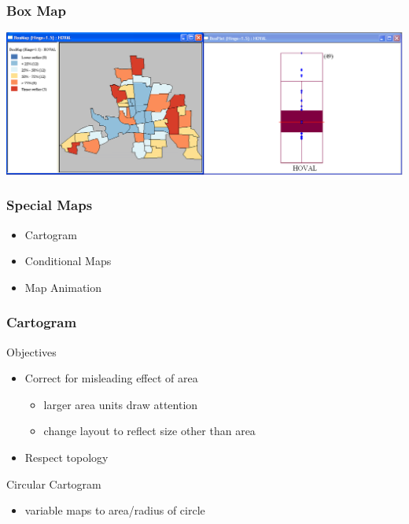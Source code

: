 \documentclass[nototal]{beamer}
\begin{document}
\begin{frame}
	\frametitle{Box Map}
 \begin{center}
 \includegraphics[width=.85\linewidth]{boxmapgeoda.png}
  \end{center}
 \end{frame} 

\begin{frame}
	\frametitle{Special Maps}
 \begin{itemize}
 \item  Cartogram
 \item  Conditional Maps
 \item  Map Animation
 \end{itemize}
 \end{frame} 

\begin{frame}
	\frametitle{Cartogram}
 
\begin{block}{Objectives}
 \begin{itemize}
 \item  Correct for  misleading effect of area
 \begin{itemize}
 \item  larger area units  draw attention
 \item  change layout to reflect size other than area
 \end{itemize}
 \item  Respect topology
 \end{itemize}
 \end{block} 
\begin{block}{Circular Cartogram}
 \begin{itemize}
 \item  variable maps to area/radius of circle
 \end{itemize}
 \end{block} \end{frame} 
\end{document}
